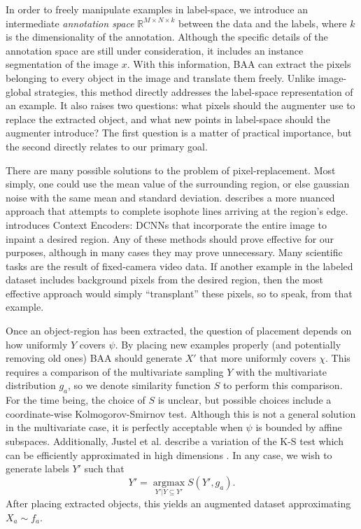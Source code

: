 \documentclass[10pt, draftcls]{IEEEtran}
\DeclareMathOperator{\argmax}{argmax}
\begin{document}
In order to freely manipulate examples in label-space, we introduce an
intermediate \emph{annotation space} $\mathbb{R}^{M\times N \times k}$ between
the data and the labels, where $k$ is the dimensionality of the
annotation. Although the specific details of the annotation space are still
under consideration, it includes an instance segmentation of the image $x$. With
this information, BAA can extract the pixels belonging to every object in the
image and translate them freely. Unlike image-global strategies, this method
directly addresses the label-space representation of an example. It also raises
two questions: what pixels should the augmenter use to replace the extracted
object, and what new points in label-space should the augmenter introduce? The
first question is a matter of practical importance, but the second directly
relates to our primary goal.

There are many possible solutions to the problem of pixel-replacement. Most
simply, one could use the mean value of the surrounding region, or else gaussian
noise with the same mean and standard deviation. \cite{bertalmio_image_2000}
describes a more nuanced approach that attempts to complete isophote lines
arriving at the region's edge. \cite{pathak_context_2016} introduces Context
Encoders: DCNNs that incorporate the entire image to inpaint a desired
region. Any of these methods should prove effective for our purposes, although
in many cases they may prove unnecessary. Many scientific tasks are the result
of fixed-camera video data. If another example in the labeled dataset includes
background pixels from the desired region, then the most effective approach
would simply ``transplant'' these pixels, so to speak, from that example.

Once an object-region has been extracted, the question of placement depends on
how uniformly $Y$ covers $\psi$. By placing new examples properly (and
potentially removing old ones) BAA should generate $X'$ that more uniformly
covers $\chi$. This requires a comparison of the multivariate sampling $Y$ with
the multivariate distribution $g_a$, so we denote similarity function $S$ to
perform this comparison. For the time being, the choice of $S$ is unclear, but
possible choices include a coordinate-wise Kolmogorov-Smirnov test. Although
this is not a general solution in the multivariate case, it is perfectly
acceptable when $\psi$ is bounded by affine subspaces. Additionally, Justel et
al. describe a variation of the K-S test which can be efficiently approximated
in high dimensions \cite{justel_multivariate_1997}. In any case, we wish to
generate labels $Y'$ such that
\[ Y' = \underset{Y' | Y \subseteq Y'}{\argmax} S(Y', g_a). \] After placing
extracted objects, this yields an augmented dataset approximating
$X_a \sim f_a$.
\end{document}
